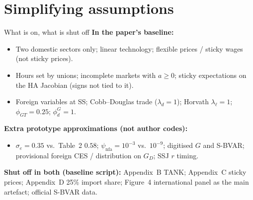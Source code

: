 \documentclass[11pt,aspectratio=169]{beamer}
\begin{document}
\section{Simplifying assumptions}
\begin{frame}{What is on, what is shut off}
  \textbf{In the paper's baseline:}
  \begin{itemize}
    \item Two domestic sectors only; linear technology; flexible prices /
          sticky wages (not sticky prices).
    \item Hours set by unions; incomplete markets with $a\ge 0$; sticky
          expectations on the HA Jacobian (signs not tied to it).
    \item Foreign variables at SS; Cobb--Douglas trade ($\lambda_d=1$);
          Horvath $\lambda_{\ell}=1$; $\phi_{GT}=0.25$; $\phi^G_d=1$.
  \end{itemize}
  \textbf{Extra prototype approximations (not author codes):}
  \begin{itemize}
    \item $\sigma_e=0.35$ vs.\ Table~2 $0.58$; $\psi_{\mathrm{nfa}}=10^{-3}$
          vs.\ $10^{-9}$; digitised $G$ and S-BVAR; provisional foreign
          CES / distribution on $G_D$; SSJ $r$ timing.
  \end{itemize}
  \textbf{Shut off in both (baseline script):}
  Appendix~B TANK; Appendix~C sticky prices; Appendix~D 25\% import share;
  Figure~4 international panel as the main artefact; official S-BVAR data.
\end{frame}

\end{document}
